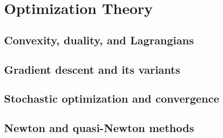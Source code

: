 ﻿\chapter{Optimization Theory}
\section{Convexity, duality, and Lagrangians}

\section{Gradient descent and its variants}

\section{Stochastic optimization and convergence}

\section{Newton and quasi-Newton methods}


